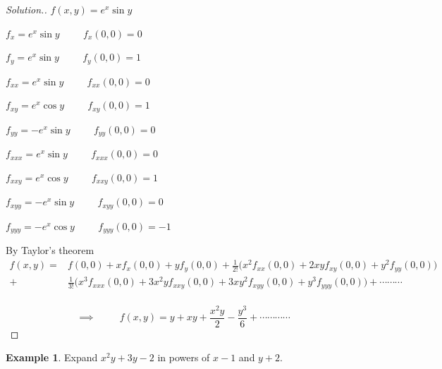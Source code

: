 \documentclass[11pt,a4paper]{article}
\theoremstyle{definition}
\newtheorem{exa}[thm]{Example}
\newenvironment{solution}
  {\renewcommand{\qedsymbol}{}\begin{proof}[\textit{Solution}.]}
  {\end{proof}}
\begin{document}
\begin{solution}


$f(x,y) = e^x\sin y$


$f_x = e^x\sin y\hspace{1cm} f_x(0,0) = 0$


$f_y = e^x \sin y\hspace{1cm} f_y(0,0) = 1$


$f_{xx} = e^x\sin y \hspace{1cm} f_{xx} (0,0) = 0$


$f_{xy} = e^x \cos y \hspace{1cm} f_{xy} (0,0) = 1$


$f_{yy} = -e^x \sin y \hspace{1cm} f_{yy} (0,0) = 0$


$f_{xxx} = e^x \sin y \hspace{1cm} f_{xxx} (0,0) = 0$


$f_{xxy} = e^x\cos y \hspace{1cm} f_{xxy} (0,0) = 1$


$f_{xyy} = -e^x\sin y \hspace{1cm} f_{xyy} (0,0) = 0$


$f_{yyy} = -e^x \cos y \hspace{1cm} f_{yyy} (0,0) = -1$


By Taylor's theorem
\begin{align*}
f(x,y)  = & f(0,0) + xf_x(0,0) + yf_y(0,0) + \frac{1}{2!}\bigg(x^2f_{xx}(0,0) + 2xyf_{xy}(0,0) +y^2f_{yy}(0,0)\bigg)\\ + &\frac{1}{3!}\bigg(x^3f_{xxx}(0,0) + 3x^2yf_{xxy}(0,0) + 3xy^2f_{xyy}(0,0) + y^3f_{yyy}(0,0)\bigg) + \cdots\cdots\cdots\\
\end{align*}

$$\implies\hspace{1cm} f(x,y) = y + xy + \frac{x^2y}{2} - \frac{y^3}{6} + \cdots\cdots\cdots\cdots$$
\end{solution}


\begin{exa}


Expand $x^2y + 3y -2$ in powers of $x - 1$ and $y + 2$.
\end{exa}
\end{document}

